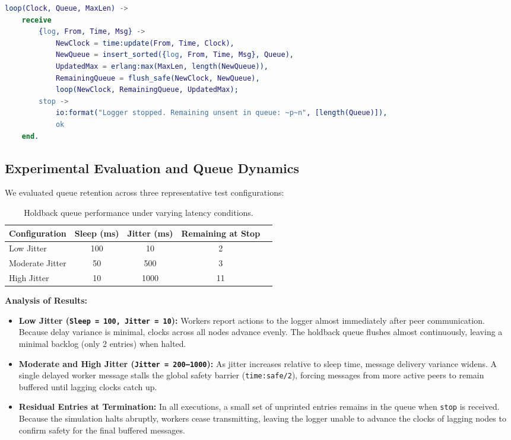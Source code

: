 \documentclass[a4paper, 11pt]{article}
\begin{document}
\begin{lstlisting}[language=erlang]
loop(Clock, Queue, MaxLen) ->
    receive
        {log, From, Time, Msg} ->
            NewClock = time:update(From, Time, Clock),
            NewQueue = insert_sorted({log, From, Time, Msg}, Queue),
            UpdatedMax = erlang:max(MaxLen, length(NewQueue)),
            RemainingQueue = flush_safe(NewClock, NewQueue),
            loop(NewClock, RemainingQueue, UpdatedMax);
        stop ->
            io:format("Logger stopped. Remaining unsent in queue: ~p~n", [length(Queue)]),
            ok
    end.
\end{lstlisting}

\subsection{Experimental Evaluation and Queue Dynamics}
We evaluated queue retention across three representative test configurations:

\begin{table}[htbp]
\centering
\small
\begin{tabular}{lcccc}
\toprule
\textbf{Configuration} & \textbf{Sleep (ms)} & \textbf{Jitter (ms)} & \textbf{Remaining at Stop} \\
\midrule
Low Jitter      & 100 & 10   & 2  \\
Moderate Jitter & 50  & 500  & 3 \\
High Jitter     & 10  & 1000 & 11 \\
\bottomrule
\end{tabular}
\caption{Holdback queue performance under varying latency conditions.}
\label{tab:queue_results}
\end{table}

\textbf{Analysis of Results:}
\begin{itemize}
    \item \textbf{Low Jitter (\texttt{Sleep = 100, Jitter = 10}):} Workers report actions to the logger almost immediately after peer communication. Because delay variance is minimal, clocks across all nodes advance evenly. The holdback queue flushes almost continuously, leaving a minimal backlog (only 2 entries) when halted.
    \item \textbf{Moderate and High Jitter (\texttt{Jitter = 200--1000}):} As jitter increases relative to sleep time, message delivery variance widens. A single delayed worker message stalls the global safety barrier (\texttt{time:safe/2}), forcing messages from more active peers to remain buffered until lagging clocks catch up.
    \item \textbf{Residual Entries at Termination:} In all executions, a small set of unprinted entries remains in the queue when \texttt{stop} is received. Because the simulation halts abruptly, workers cease transmitting, leaving the logger unable to advance the clocks of lagging nodes to confirm safety for the final buffered messages.
\end{itemize}
\end{document}
